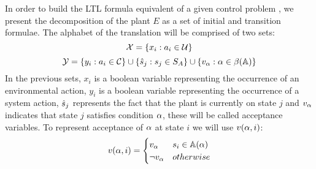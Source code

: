 %
In order to build the LTL formula equivalent of a given control problem \controlProblemDef, we present the decomposition of the plant $E$ as a set of initial and transition formulae.
The alphabet of the translation will be comprised of two sets:
\[{\mathcal{X}} = \{x_i : a_i \in \mathcal{U} \}\]
\[{\mathcal{Y}} = \{y_i : a_i \in \mathcal{C} \} \cup \{\hat{s}_{j} : s_j \in S_A \} \cup \{v_{\alpha} : \alpha \in \beta(\mathbb{A})\}\]
In the previous sets, $x_i$ is a boolean variable representing the occurrence of an environmental action, $y_i$ is a boolean variable representing the occurrence of a system action, $\hat{s}_{j}$ represents the fact that the plant is currently on state $j$ and $v_{\alpha}$ indicates that state $j$ satisfies condition $\alpha$, these will be called acceptance variables.
To represent acceptance of $\alpha$ at state $i$ we will use $v(\alpha,i)$:
\[
v(\alpha,i) = \begin{cases}
v_{\alpha} & s_i \in \mathbb{A}(\alpha) \\
\neg v_{\alpha} & otherwise
\end{cases}
\]

